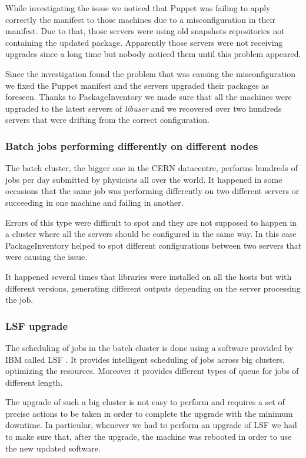   While investigating the issue we noticed that Puppet was failing to
  apply correctly the manifest to those machines due to a misconfiguration
  in their manifest. Due to that, those servers were using old snapshots
  repositories not containing the updated package. Apparently those
  servers were not receiving upgrades since a long time but nobody noticed
  them until this problem appeared.

  Since the investigation found the problem that was causing the
  misconfiguration we fixed the Puppet manifest and the servers upgraded
  their packages as foreseen. Thanks to PackageInventory we made sure that
  all the machines were upgraded to the latest servers of \textit{libuser}
  and we recovered over two hundreds servers that were drifting from the
  correct configuration.

  \subsubsection{Batch jobs performing differently on different nodes}

  The batch cluster, the bigger one in the CERN datacentre, performs
  hundreds of jobs per day submitted by physicists all over the world. It
  happened in some occasions that the same job was performing differently
  on two different servers or succeeding in one machine and failing in
  another.

  Errors of this type were difficult to spot and they are not supposed to
  happen in a cluster where all the servers should be configured in the
  same way. In this case PackageInventory helped to spot different
  configurations between two servers that were causing the issue.

  It happened several times that libraries were installed on all the hosts
  but with different versions, generating different outputs depending on
  the server processing the job.

  \subsubsection{LSF upgrade}

  The scheduling of jobs in the batch cluster is done using a software
  provided by IBM called LSF \cite{ibm-lsf}. It provides intelligent
  scheduling of jobs across big clusters, optimizing the resources.
  Moreover it provides different types of queue for jobs of different
  length.

  The upgrade of such a big cluster is not easy to perform and requires
  a set of precise actions to be taken in order to complete the upgrade
  with the minimum downtime. In particular, whenever we had to perform an
  upgrade of LSF we had to make sure that, after the upgrade, the machine
  was rebooted in order to use the new updated software.

